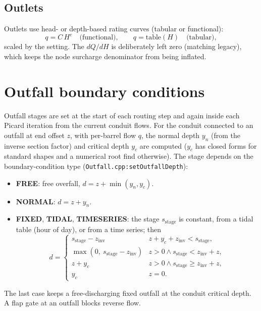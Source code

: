 \documentclass[11pt,a4paper]{article}
\begin{document}
\subsection{Outlets}

Outlets use head- or depth-based rating curves (tabular or functional):
\begin{equation}
  q = C\,H^{e} \quad\text{(functional)}, \qquad
  q = \mathrm{table}(H) \quad\text{(tabular)},
\end{equation}
scaled by the setting. The $dQ/dH$ is deliberately left zero (matching
legacy), which keeps the node surcharge denominator from being inflated.

\section{Outfall boundary conditions}
\label{sec:outfall}

Outfall stages are set at the start of each routing step and again inside each
Picard iteration from the current conduit flows. For the conduit connected to
an outfall at end offset $z$, with per-barrel flow $q$, the normal depth
$y_n$ (from the inverse section factor) and critical depth $y_c$ are computed
($y_c$ has closed forms for standard shapes and a numerical root find
otherwise). The stage depends on the boundary-condition type
(\texttt{Outfall.cpp:setOutfallDepth}):
\begin{itemize}[nosep]
  \item \textbf{FREE}: free overfall, $d = z + \min(y_n, y_c)$.
  \item \textbf{NORMAL}: $d = z + y_n$.
  \item \textbf{FIXED}, \textbf{TIDAL}, \textbf{TIMESERIES}: the stage
        $s_{\mathrm{stage}}$ is constant, from a tidal table (hour of day), or
        from a time series; then
        \begin{equation}
          d = \begin{cases}
            s_{\mathrm{stage}} - z_{\mathrm{inv}} & z + y_c + z_{\mathrm{inv}}
              < s_{\mathrm{stage}},\\
            \max(0,\ s_{\mathrm{stage}} - z_{\mathrm{inv}}) & z > 0 \wedge
              s_{\mathrm{stage}} < z_{\mathrm{inv}} + z,\\
            z + y_c & z > 0 \wedge s_{\mathrm{stage}} \ge z_{\mathrm{inv}} + z,\\
            y_c & z = 0.
          \end{cases}
        \end{equation}
\end{itemize}
The last case keeps a free-discharging fixed outfall at the conduit critical
depth. A flap gate at an outfall blocks reverse flow.
\end{document}
